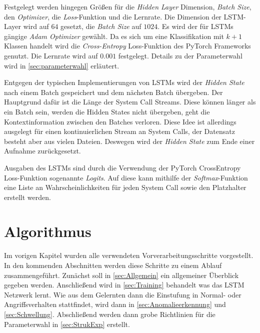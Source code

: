        Festgelegt werden hingegen Größen für die \textit{Hidden Layer} Dimension, \textit{Batch Size}, den \textit{Optimizer}, die \textit{Loss}-Funktion und die Lernrate.
        Die Dimension der \ac{LSTM}-Layer wird auf $64$ gesetzt, die \textit{Batch Size} auf $1024$.
        Es wird der für \acp{LSTM} gängige \textit{Adam Optimizer} gewählt.
        Da es sich um eine Klassifikation mit $k+1$ Klassen handelt wird die \textit{Cross-Entropy} Loss-Funktion des PyTorch Frameworks genutzt.
        Die Lernrate wird auf $0.001$ festgelegt.
        Details zu der Parameterwahl wird in \autoref{sec:parameterwahl} erläutert.

        Entgegen der typischen Implementierungen von \acp{LSTM} wird der \textit{Hidden State} nach einem Batch gespeichert und dem nächsten Batch  übergeben. 
        Der Hauptgrund dafür ist die Länge der System Call Streams.
        Diese können länger als ein Batch sein, werden die Hidden States nicht übergeben, geht die Kontextinformation zwischen den Batches verloren.
        Diese Idee ist allerdings ausgelegt für einen kontinuierlichen Stream an System Calls, der Datensatz besteht aber aus vielen Dateien.
        Deswegen wird der \textit{Hidden State} zum Ende einer Aufnahme zurückgesetzt.

        Ausgaben des \acp{LSTM} sind durch die Verwendung der PyTorch CrossEntropy Loss-Funktion sogenannte \textit{Logits}.
        Auf diese kann mithilfe der \textit{Softmax}-Funktion eine Liste an Wahrscheinlichkeiten für jeden System Call sowie den Platzhalter erstellt werden.

    \section{Algorithmus}\label{sec:Algorithmus}
        Im vorigen Kapitel wurden alle verwendeten Vorverarbeitungsschritte vorgestellt.
        In den kommenden Abschnitten werden diese Schritte zu einem Ablauf zusammengeführt.
        Zunächst soll in \autoref{sec:Allgemein} ein allgemeiner Überblick gegeben werden.
        Anschließend wird in \autoref{sec:Training} behandelt was das \ac{LSTM} Netzwerk lernt.
        Wie aus dem Gelernten dann die Einstufung in Normal- oder Angriffsverhalten stattfindet, wird dann in \autoref{sec:Anomalieerkennung} und \autoref{sec:Schwellung}.
        Abschließend werden dann grobe Richtlinien für die Parameterwahl in \autoref{sec:StrukExp} erstellt.

